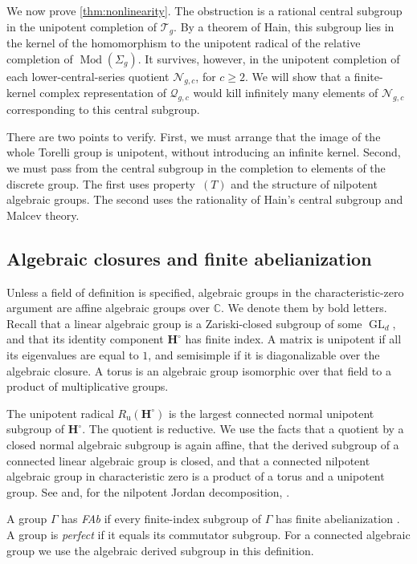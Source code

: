 \documentclass[11pt,a4paper]{article}
\theoremstyle{definition}
\newcommand{\C}{\mathbb C}
\newcommand{\Mod}{\operatorname{Mod}}
\newcommand{\GL}{\operatorname{GL}}
\newcommand{\rt}{(T)}
\newcommand{\Ru}{R_{\mathrm u}}
\begin{document}
We now prove \cref{thm:nonlinearity}. The obstruction is a rational
central subgroup in the unipotent completion of \(\mathcal{T}_g\). By a theorem
of Hain, this subgroup lies in the kernel of the homomorphism to the
unipotent radical of the relative completion of \(\Mod(\Sigma_g)\). It survives,
however, in the unipotent completion of each lower-central-series quotient
\(\mathcal N_{g,c}\), for \(c\ge2\). We will show
that a finite-kernel complex representation of \(\mathcal{Q}_{g,c}\) would kill
infinitely many elements of \(\mathcal{N}_{g,c}\) corresponding to this central
subgroup.

There are two points to verify. First, we must arrange that the image
of the whole Torelli group is unipotent, without introducing an infinite
kernel. Second, we must pass from the central subgroup in the completion
to elements of the discrete group. The first uses property~\(\rt\)
and the structure of nilpotent algebraic groups. The second uses the
rationality of Hain's central subgroup and Malcev theory.

\subsection{Algebraic closures and finite abelianization}

Unless a field of definition is specified, algebraic groups in the
characteristic-zero argument are affine algebraic groups over \(\C\).
We denote them by bold letters. Recall that a linear algebraic group
is a Zariski-closed subgroup of some \(\GL_d\), and that its identity
component \(\mathbf H^\circ\) has finite index. A matrix is unipotent
if all its eigenvalues are equal to \(1\), and semisimple if it is
diagonalizable over the algebraic closure. A torus is an algebraic
group isomorphic over that field to a product of multiplicative groups.

The unipotent radical \(\Ru(\mathbf H^\circ)\) is the largest
connected normal unipotent subgroup of \(\mathbf H^\circ\). The
quotient is reductive. We use the facts that a quotient by a closed
normal algebraic subgroup is again affine, that the derived subgroup
of a connected linear algebraic group is closed, and that a connected
nilpotent algebraic group in characteristic zero is a product of a
torus and a unipotent group. See \cite{Borel} and, for the nilpotent
Jordan decomposition, \cite[Section~2.1 and Appendix~A]{Baues}.

A group \(\Gamma\) has \emph{FAb} if every finite-index subgroup of
\(\Gamma\) has finite abelianization \cite[Section~1]{AbertLubotzkyPyber}. A group is \emph{perfect} if it
equals its commutator subgroup. For a connected algebraic group we use
the algebraic derived subgroup in this definition.
\end{document}

